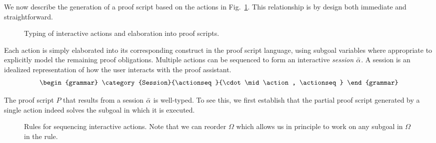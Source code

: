We now describe the generation of a proof script based on the
actions in Fig.~\ref{fig:interactive}. This relationship is by
design both immediate and straightforward.

\begin{figure}
  \caption{%
    Typing of interactive actions and elaboration into proof scripts.
  }%
  \label{fig:interactive}%
\end{figure}

Each action is simply elaborated into its corresponding construct in the proof
script language, using subgoal variables where appropriate to explicitly model
the remaining proof obligations.
%
%
%
%
%
Multiple actions can be sequenced to form an interactive
\emph{session} $\bar{\alpha}$. A session is an idealized representation of how the
user interacts with the proof assistant.
%
\[
  \begin{grammar}
    \category{Session}{\actionseq}{\cdot \mid \action, \actionseq}
  \end{grammar}
\]
%

The proof script $P$ that results from a session $\bar{\alpha}$ is well-typed.
To see this, we first establish that the partial proof script generated by a
single action indeed solves the subgoal in which it is executed.

\begin{figure}[ht]
  \caption{%
    Rules for sequencing interactive \Harpoon{} actions.
    Note that we can reorder $\Omega$ which allows us in principle to work on
    any subgoal in $\Omega$ in the \isingle{} rule.%
  }%
  \label{fig:harpoon-session}
\end{figure}
%


